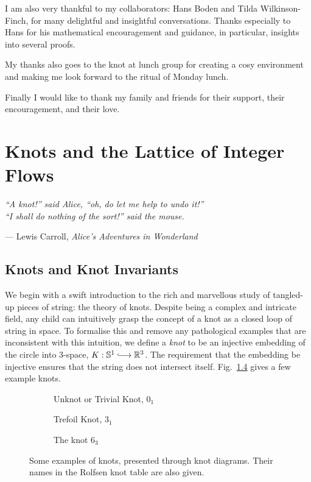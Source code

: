 \documentclass[12pt]{report}
\newcommand{\R}{\mathbb{R}}
\renewcommand{\S}{\mathbb{S}}
\newcommand{\inject}{\lhook\joinrel\longrightarrow}
\theoremstyle{upright}
\begin{document}
I am also very thankful to my collaborators: Hans Boden and Tilda Wilkinson-Finch, for many delightful and insightful conversations. Thanks especially to Hans for his mathematical encouragement and guidance, in particular, insights into several proofs.

My thanks also goes to the knot at lunch group for creating a cosy environment and making me look forward to the ritual of Monday lunch.

Finally I would like to thank my family and friends for their support, their encouragement, and their love.

\chapter{Knots and the Lattice of Integer Flows}
\epigraph{\itshape ``A knot!'' said Alice, ``oh, do let me help to undo it!''\\``I shall do nothing of the sort!'' said the mouse.}{--- Lewis Carroll, \textit{Alice's Adventures in Wonderland}}

\section{Knots and Knot Invariants}

We begin with a swift introduction to the rich and marvellous study of tangled-up pieces of string: the theory of knots. Despite being a complex and intricate field, any child can intuitively grasp the concept of a knot as a closed loop of string in space. To formalise this and remove any pathological examples that are inconsistent with this intuition, we define a \textit{knot} to be an injective embedding of the circle into $3$-space, $K: \S^{1} \inject \R^{3}$. The requirement that the embedding be injective ensures that the string does not intersect itself. Fig.~\ref{fig:knot-examples} gives a few example knots.

\begin{figure}[hbt!]
	\centering
	\hspace*{\fill}
	\begin{subfigure}[b]{0.3 \textwidth}
		\centering
		\def\svgscale{0.2}
		
		\caption{Unknot or Trivial Knot, $0_{1}$}
		\label{fig:unknot}
	\end{subfigure}
	\hspace*{\fill}
	\begin{subfigure}[b]{0.3 \textwidth}
		\centering
		\def\svgscale{0.2}
		
		\caption{Trefoil Knot, $3_{1}$}
		\label{fig:trefoil}
	\end{subfigure}
	\hspace*{\fill}
	\begin{subfigure}[b]{0.3 \textwidth}
		\centering
		\def\svgscale{0.2}
		
		\caption{The knot $6_{3}$}
		\label{fig:6-3-knot}
	\end{subfigure}
	\caption{Some examples of knots, presented through knot diagrams. Their names in the Rolfsen knot table are also given.}
	\label{fig:knot-examples}
	\hspace*{\fill} 
\end{figure}
\end{document}
